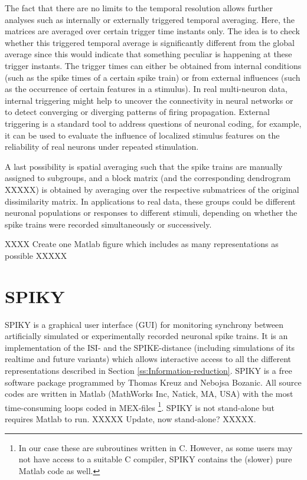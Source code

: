 \documentclass[10pt,twocolumn]{elsart5p}
\begin{document}
The fact that there are no limits to the temporal resolution allows further analyses such as internally or externally triggered temporal averaging. Here, the matrices are averaged over certain trigger time instants only. The idea is to check whether this triggered temporal average is significantly different from the global average since this would indicate that something peculiar is happening at these trigger instants. The trigger times can either be obtained from internal conditions (such as the spike times of a certain spike train) or from external influences (such as the occurrence of certain features in a stimulus). In real multi-neuron data, internal triggering might help to uncover the connectivity in neural networks or to detect converging or diverging patterns of firing propagation. External triggering is a standard tool to address questions of neuronal coding, for example, it can be used to evaluate the influence of localized stimulus features on the reliability of real neurons under repeated stimulation.

A last possibility is spatial averaging such that the spike trains are manually assigned to subgroups, and a block matrix (and the corresponding dendrogram XXXXX) is obtained by averaging over the respective submatrices of the original dissimilarity matrix. In applications to real data, these groups could be different neuronal populations or responses to different stimuli, depending on whether the spike trains were recorded simultaneously or successively.

XXXX Create one Matlab figure which includes as many representations as possible XXXXX

%
%
%
%
\section{\label{s:SPIKY} SPIKY}

SPIKY is a graphical user interface (GUI) for monitoring synchrony between artificially simulated or experimentally recorded neuronal spike trains. It is an implementation of the ISI- and the SPIKE-distance (including simulations of its realtime and future variants) which allows  interactive access to all the different representations described in Section \ref{ss:Information-reduction}. SPIKY is a free software package programmed by Thomas Kreuz and Nebojsa Bozanic. All source codes are written in Matlab (MathWorks Inc, Natick, MA, USA) with the most time-consuming loops coded in MEX-files \footnote{In our case these are subroutines written in C. However, as some users may not have access to a suitable C compiler, SPIKY contains the (slower) pure Matlab code as well.}. SPIKY is not stand-alone but requires Matlab to run. XXXXX Update, now stand-alone? XXXXX.
\end{document}
